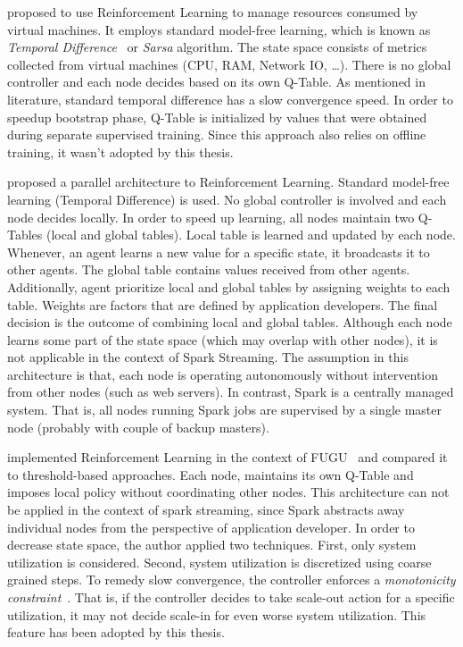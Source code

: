 \textcite{Rao:2009:VRL} proposed to use Reinforcement Learning to manage resources consumed by virtual machines. It employs standard model-free learning, which is known as \emph{Temporal Difference}~\cite{rlIntro} or \emph{Sarsa} algorithm. The state space consists of metrics collected from virtual machines (CPU, RAM, Network IO, \dots). There is no global controller and each node decides based on its own Q-Table. As mentioned in literature, standard temporal difference has a slow convergence speed. In order to speedup bootstrap phase, Q-Table is initialized by values that were obtained during separate supervised training. Since this approach also relies on offline training, it wasn't adopted by this thesis.

\textcite{Enda:2012} proposed a parallel architecture to Reinforcement Learning. Standard model-free learning (Temporal Difference) is used. No global controller is involved and each node decides locally. In order to speed up learning, all nodes maintain two Q-Tables (local and global tables). Local table is learned and updated by each node. Whenever, an agent learns a new value for a specific state, it broadcasts it to other agents. The global table contains values received from other agents. Additionally, agent prioritize local and global tables by assigning weights to each table. Weights are factors that are defined by application developers. The final decision is the outcome of combining local and global tables. Although each node learns some part of the state space (which may overlap with other nodes), it is not applicable in the context of Spark Streaming. The assumption in this architecture is that, each node is operating autonomously without intervention from other nodes (such as web servers). In contrast, Spark is a centrally managed system. That is, all nodes running Spark jobs are supervised by a single master node (probably with couple of backup masters).

\textcite{Heinze:2014} implemented Reinforcement Learning in the context of FUGU~\cite{Grandl:2014:MPC} and compared it to threshold-based approaches. Each node, maintains its own Q-Table and imposes local policy without coordinating other nodes. This architecture can not be applied in the context of spark streaming, since Spark abstracts away individual nodes from the perspective of application developer. In order to decrease state space, the author applied two techniques. First, only system utilization is considered. Second, system utilization is discretized using coarse grained steps. To remedy slow convergence, the controller enforces a \emph{monotonicity constraint}~\cite{Herodotou:2011}. That is, if the controller decides to take scale-out action for a specific utilization, it may not decide scale-in for even worse system utilization. This feature has been adopted by this thesis.  

